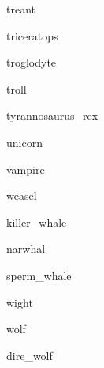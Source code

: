 \documentclass[letterpaper,serif]{module}
\begin{document}
\begin{newmonster}{treant}\end{newmonster}

\begin{newmonster}{triceratops}\end{newmonster}

\begin{newmonster}{troglodyte}\end{newmonster}

\begin{newmonster}{troll}\end{newmonster}

\begin{newmonster}{tyrannosaurus_rex}\end{newmonster}

\begin{newmonster}{unicorn}\end{newmonster}

\begin{newmonster}{vampire}\end{newmonster}

\begin{newmonster}{weasel}\end{newmonster}

\begin{newmonster}{killer_whale}\end{newmonster}

\begin{newmonster}{narwhal}\end{newmonster}

\begin{newmonster}{sperm_whale}\end{newmonster}

\begin{newmonster}{wight}\end{newmonster}

\begin{newmonster}{wolf}\end{newmonster}

\begin{newmonster}{dire_wolf}\end{newmonster}
\end{document}
